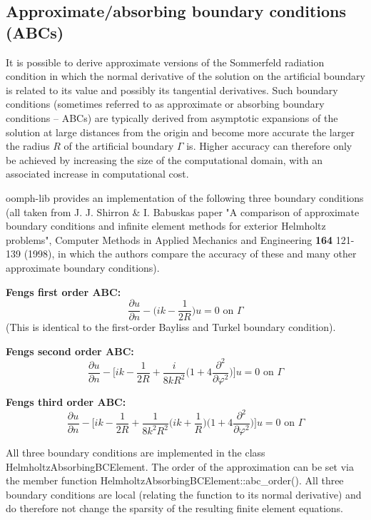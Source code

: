 \hypertarget{index_ABCs}{}\subsection{Approximate/absorbing boundary conditions (\+A\+B\+Cs)}\label{index_ABCs}
It is possible to derive approximate versions of the Sommerfeld radiation condition in which the normal derivative of the solution on the artificial boundary is related to its value and possibly its tangential derivatives. Such boundary conditions (sometimes referred to as approximate or absorbing boundary conditions -- A\+B\+Cs) are typically derived from asymptotic expansions of the solution at large distances from the origin and become more accurate the larger the radius $ R $ of the artificial boundary $ \Gamma $ is. Higher accuracy can therefore only be achieved by increasing the size of the computational domain, with an associated increase in computational cost.

{\ttfamily oomph-\/lib} provides an implementation of the following three boundary conditions (all taken from J. J. Shirron \& I. Babuska\textquotesingle{}s paper "A comparison of approximate boundary conditions and infinite element methods for exterior Helmholtz problems", Computer Methods in Applied Mechanics and Engineering {\bfseries 164} 121-\/139 (1998), in which the authors compare the accuracy of these and many other approximate boundary conditions).


\begin{DoxyItemize}
\item {\bfseries Feng\textquotesingle{}s first order A\+BC\+:} \[ \frac {\partial u}{\partial n}-\bigg( ik - \frac{1}{2R}\bigg) u =0 \mbox{\ \ \ \ \ on\ }\Gamma \] (This is identical to the first-\/order Bayliss and Turkel boundary condition).
\item {\bfseries Feng\textquotesingle{}s second order A\+BC\+:} \[ \frac{\partial u}{\partial n}-\bigg[ik-\frac {1}{2R}+\frac{i}{8kR^{2}}\bigg(1+4 \frac {\partial^{2}}{\partial \varphi^{2}}\bigg)\bigg]u =0 \mbox{\ \ \ \ \ on\ }\Gamma \]
\item {\bfseries Feng\textquotesingle{}s third order A\+BC\+:} \[ \frac {\partial u}{\partial n}-\bigg[ik-\frac {1}{2R}+\frac{1}{8k^{2}R^{2}}\bigg(ik+ \frac {1}{R}\bigg) \bigg(1+4 \frac {\partial^{2}}{\partial \varphi^{2}}\bigg)\bigg]u =0 \mbox{\ \ \ \ \ on\ }\Gamma \]
\end{DoxyItemize}All three boundary conditions are implemented in the class {\ttfamily Helmholtz\+Absorbing\+B\+C\+Element}. The order of the approximation can be set via the member function {\ttfamily Helmholtz\+Absorbing\+B\+C\+Element\+::abc\+\_\+order()}. All three boundary conditions are local (relating the function to its normal derivative) and do therefore not change the sparsity of the resulting finite element equations.



